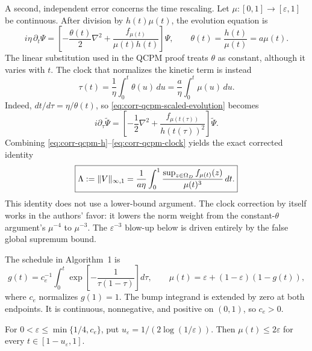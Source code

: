 A second, independent error concerns the time rescaling.  Let
$\mu:[0,1]\to[\varepsilon,1]$ be continuous.  After division
by $h(t)\mu(t)$, the evolution equation is
\begin{equation}
 i\eta\,\partial_t\Psi
 =\left[-\frac{\theta(t)}2\nabla^2
       +\frac{f_{\mu(t)}}{\mu(t)h(t)}\right]\Psi,
 \qquad \theta(t)=\frac{h(t)}{\mu(t)}=a\mu(t).           \label{eq:corr-qcpm-scaled-evolution}
\end{equation}
The linear substitution used in the QCPM proof treats $\theta$ as constant,
although it varies with $t$.  The clock that normalizes the kinetic term is
instead
\begin{equation}
 \tau(t)=\frac1\eta\int_0^t\theta(u)\,du
        =\frac a\eta\int_0^t\mu(u)\,du.                 \label{eq:corr-qcpm-clock}
\end{equation}
Indeed, $dt/d\tau=\eta/\theta(t)$, so
\eqref{eq:corr-qcpm-scaled-evolution} becomes
\begin{equation}
 i\partial_\tau\widetilde\Psi
 =\left[-\frac12\nabla^2
        +\frac{f_{\mu(t(\tau))}}{h(t(\tau))^2}\right]
   \widetilde\Psi.                                      \label{eq:corr-qcpm-corrected-evolution}
\end{equation}
Combining \eqref{eq:corr-qcpm-h}--\eqref{eq:corr-qcpm-clock} yields the
exact corrected identity
\begin{equation}
 \boxed{
 \Lambda:=\lVert V\rVert_{\infty,1}
 =\frac1{a\eta}\int_0^1
   \frac{\sup_{z\in\Omega_D}f_{\mu(t)}(z)}{\mu(t)^3}\,dt.}
                                                               \label{eq:corr-qcpm-exact-norm}
\end{equation}
This identity does not use a lower-bound argument.  The clock correction by
itself works in the authors' favor: it lowers the norm weight from the
constant-$\theta$ argument's $\mu^{-4}$ to $\mu^{-3}$.  The
$\varepsilon^{-3}$ blow-up below is driven entirely by the false global
supremum bound.

The schedule in Algorithm~1 is
\begin{equation}
 g(t)=c_e^{-1}\int_0^t
 \exp\!\left[-\frac1{\tau(1-\tau)}\right]d\tau,
 \qquad
 \mu(t)=\varepsilon+(1-\varepsilon)(1-g(t)),            \label{eq:corr-qcpm-schedule}
\end{equation}
where $c_e$ normalizes $g(1)=1$.
The bump integrand is extended by zero at both endpoints.  It is
continuous, nonnegative, and positive on $(0,1)$, so $c_e>0$.

\begin{lemma}
\label{lem:corr-qcpm-endpoint}
For $0<\varepsilon\leq\min\{1/4,c_e\}$, put
$u_\varepsilon=1/(2\log(1/\varepsilon))$.  Then
$\mu(t)\leq2\varepsilon$ for every
$t\in[1-u_\varepsilon,1]$.
\end{lemma}

